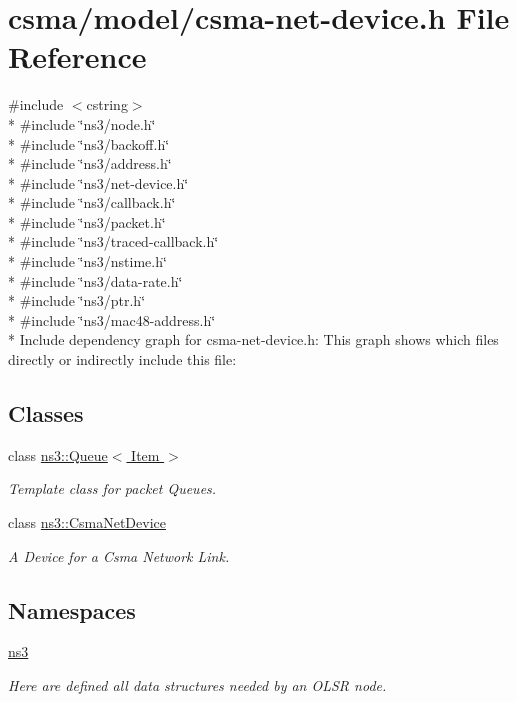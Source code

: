 \hypertarget{csma-net-device_8h}{}\section{csma/model/csma-\/net-\/device.h File Reference}
\label{csma-net-device_8h}
{\ttfamily \#include $<$cstring$>$}\\*
{\ttfamily \#include \char`\"{}ns3/node.\+h\char`\"{}}\\*
{\ttfamily \#include \char`\"{}ns3/backoff.\+h\char`\"{}}\\*
{\ttfamily \#include \char`\"{}ns3/address.\+h\char`\"{}}\\*
{\ttfamily \#include \char`\"{}ns3/net-\/device.\+h\char`\"{}}\\*
{\ttfamily \#include \char`\"{}ns3/callback.\+h\char`\"{}}\\*
{\ttfamily \#include \char`\"{}ns3/packet.\+h\char`\"{}}\\*
{\ttfamily \#include \char`\"{}ns3/traced-\/callback.\+h\char`\"{}}\\*
{\ttfamily \#include \char`\"{}ns3/nstime.\+h\char`\"{}}\\*
{\ttfamily \#include \char`\"{}ns3/data-\/rate.\+h\char`\"{}}\\*
{\ttfamily \#include \char`\"{}ns3/ptr.\+h\char`\"{}}\\*
{\ttfamily \#include \char`\"{}ns3/mac48-\/address.\+h\char`\"{}}\\*
Include dependency graph for csma-\/net-\/device.h\+:
This graph shows which files directly or indirectly include this file\+:
\subsection*{Classes}
\begin{DoxyCompactItemize}
\item 
class \hyperlink{classns3_1_1Queue}{ns3\+::\+Queue$<$ Item $>$}
\begin{DoxyCompactList}\small\item\em Template class for packet Queues. \end{DoxyCompactList}\item 
class \hyperlink{classns3_1_1CsmaNetDevice}{ns3\+::\+Csma\+Net\+Device}
\begin{DoxyCompactList}\small\item\em A Device for a Csma Network Link. \end{DoxyCompactList}\end{DoxyCompactItemize}
\subsection*{Namespaces}
\begin{DoxyCompactItemize}
\item 
 \hyperlink{namespacens3}{ns3}
\begin{DoxyCompactList}\small\item\em Here are defined all data structures needed by an O\+L\+SR node. \end{DoxyCompactList}\end{DoxyCompactItemize}
